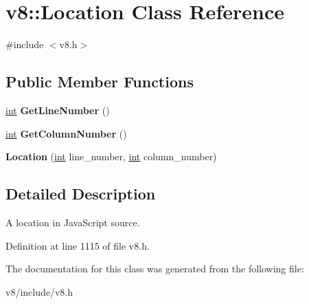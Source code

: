 \hypertarget{classv8_1_1Location}{}\section{v8\+:\+:Location Class Reference}
\label{classv8_1_1Location}


{\ttfamily \#include $<$v8.\+h$>$}

\subsection*{Public Member Functions}
\begin{DoxyCompactItemize}
\item 
\mbox{\label{classv8_1_1Location_a078f1144721e1b66a6fa55b9b56af5dc}} 
\mbox{\hyperlink{classint}{int}} {\bfseries Get\+Line\+Number} ()
\item 
\mbox{\label{classv8_1_1Location_ab1a7deae060562733237734a1caf9045}} 
\mbox{\hyperlink{classint}{int}} {\bfseries Get\+Column\+Number} ()
\item 
\mbox{\label{classv8_1_1Location_a193b270e28ce9a0825522ab46c43745c}} 
{\bfseries Location} (\mbox{\hyperlink{classint}{int}} line\+\_\+number, \mbox{\hyperlink{classint}{int}} column\+\_\+number)
\end{DoxyCompactItemize}


\subsection{Detailed Description}
A location in Java\+Script source. 

Definition at line 1115 of file v8.\+h.



The documentation for this class was generated from the following file\+:\begin{DoxyCompactItemize}
\item 
v8/include/v8.\+h\end{DoxyCompactItemize}
